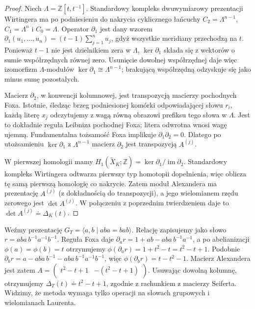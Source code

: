 \begin{proof}
Niech $\Lambda=\mathbb Z[t,t^{-1}]$.
Standardowy kompleks dwuwymiarowy prezentacji Wirtingera
ma po podniesieniu do nakrycia cyklicznego łańcuchy
$C_2=\Lambda^{n-1}$, $C_1=\Lambda^n$ i $C_0=\Lambda$.
Operator $\partial_1$ jest dany wzorem
$\partial_1(u_1,\dots,u_n)=(t-1)\sum_{j=1}^n u_j$,
gdyż wszystkie meridiany przechodzą na $t$.
Ponieważ $t-1$ nie jest dzielnikiem zera w $\Lambda$,
$\ker\partial_1$ składa się z wektorów o sumie współrzędnych
równej zero. Usunięcie dowolnej współrzędnej daje więc
izomorfizm $\Lambda$-modułów
$\ker\partial_1\cong\Lambda^{n-1}$; brakującą współrzędną
odzyskuje się jako minus sumę pozostałych.

Macierz $\partial_2$, w konwencji kolumnowej, jest
transpozycją macierzy pochodnych Foxa. Istotnie, śledząc
brzeg podniesionej komórki odpowiadającej słowu
$r_i$, każdą literę $x_j$ odczytujemy z wagą równą obrazowi
prefiksu tego słowa w $\Lambda$. Jest to dokładnie reguła
Leibniza pochodnej Foxa; litera odwrotna wnosi wagę ujemną.
Fundamentalna tożsamość Foxa implikuje
$\partial_1\partial_2=0$. Dlatego po utożsamieniu
$\ker\partial_1$ z $\Lambda^{n-1}$ macierz
$\partial_2$ jest transpozycją $A^{(j)}$.

W pierwszej homologii mamy
$H_1(\widetilde X_K;\mathbb Z)=\ker\partial_1/
\operatorname{im}\partial_2$. Standardowy kompleks
Wirtingera odtwarza pierwszy typ homotopii dopełnienia,
więc oblicza tę samą pierwszą homologię co nakrycie.
Zatem moduł Alexandera ma prezentację $A^{(j)}$
(z dokładnością do transpozycji), a jego wielomianem
rzędu zerowego jest $\det A^{(j)}$. W połączeniu z
poprzednim twierdzeniem daje to
$\det A^{(j)}\doteq\Delta_K(t)$.
\end{proof}

\begin{przyklad}
Weźmy prezentację
$G_T=\langle a,b\mid aba=bab\rangle$.
Relację zapisujemy jako słowo
$r=aba\,b^{-1}a^{-1}b^{-1}$.
Reguła Foxa daje
$\partial_a r=1+ab-aba\,b^{-1}a^{-1}$,
a po abelianizacji $\phi(a)=\phi(b)=t$ otrzymujemy
$\phi(\partial_a r)=1+t^2-t=t^2-t+1$.
Podobnie
$\partial_b r=a-aba\,b^{-1}-aba\,b^{-1}a^{-1}b^{-1}$,
więc $\phi(\partial_b r)=t-t^2-1$.
Macierz Alexandera jest zatem
$A=\begin{pmatrix}t^2-t+1&-(t^2-t+1)\end{pmatrix}$.
Usuwając dowolną kolumnę, otrzymujemy
$\Delta_T(t)\doteq t^2-t+1$, zgodnie z rachunkiem
z macierzy Seiferta. Widzimy, że metoda wymaga tylko
operacji na słowach grupowych i wielomianach Laurenta.
\end{przyklad}

